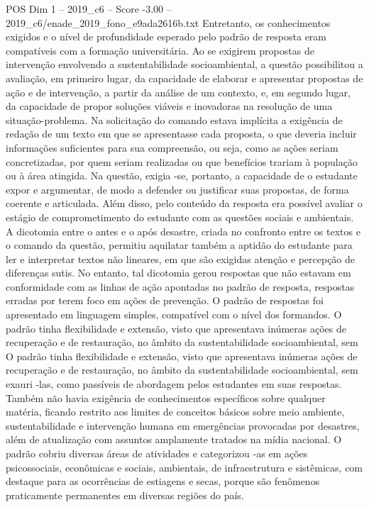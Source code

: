 \begin{textsample}{POS Dim 1 – 2019\_c6 – Score -3.00 – 2019\_c6/enade\_2019\_fono\_e9ada2616b.txt}
Entretanto, os conhecimentos exigidos e o nível de profundidade esperado pelo padrão de resposta eram compatíveis com a formação universitária.
Ao se exigirem propostas de intervenção envolvendo a sustentabilidade socioambiental, a questão possibilitou a avaliação, em primeiro lugar, da capacidade de elaborar e apresentar propostas de ação e de intervenção, a partir da análise de um contexto, e, em segundo lugar, da capacidade de propor soluções viáveis e inovadoras na resolução de uma situação-problema.
Na solicitação do comando estava implícita a exigência de redação de um texto em que se apresentasse cada proposta, o que deveria incluir informações suficientes para sua compreensão, ou seja, como as ações seriam concretizadas, por quem seriam realizadas ou que benefícios trariam à população ou à área atingida.
Na questão, exigia -se, portanto, a capacidade de o estudante expor e argumentar, de modo a defender ou justificar suas propostas, de forma coerente e articulada.
Além disso, pelo conteúdo da resposta era possível avaliar o estágio de comprometimento do estudante com as questões sociais e ambientais.
A dicotomia entre o antes e o após desastre, criada no confronto entre os textos e o comando da questão, permitiu aquilatar também a aptidão do estudante para ler e interpretar textos não lineares, em que são exigidas atenção e percepção de diferenças sutis.
No entanto, tal dicotomia gerou respostas que não estavam em conformidade com as linhas de ação apontadas no padrão de resposta, respostas erradas por terem foco em ações de prevenção.
O padrão de respostas foi apresentado em linguagem simples, compatível com o nível dos formandos.
O padrão tinha flexibilidade e extensão, visto que apresentava inúmeras ações de recuperação e de restauração, no âmbito da sustentabilidade socioambiental, sem O padrão tinha flexibilidade e extensão, visto que apresentava inúmeras ações de recuperação e de restauração, no âmbito da sustentabilidade socioambiental, sem exauri -las, como passíveis de abordagem pelos estudantes em suas respostas.
Também não havia exigência de conhecimentos específicos sobre qualquer matéria, ficando restrito aos limites de conceitos básicos sobre meio ambiente, sustentabilidade e intervenção humana em emergências provocadas por desastres, além de atualização com assuntos amplamente tratados na mídia nacional.
O padrão cobriu diversas áreas de atividades e categorizou -as em ações psicossociais, econômicas e sociais, ambientais, de infraestrutura e sistêmicas, com destaque para as ocorrências de estiagens e secas, porque são fenômenos praticamente permanentes em diversas regiões do país.

\end{textsample}
